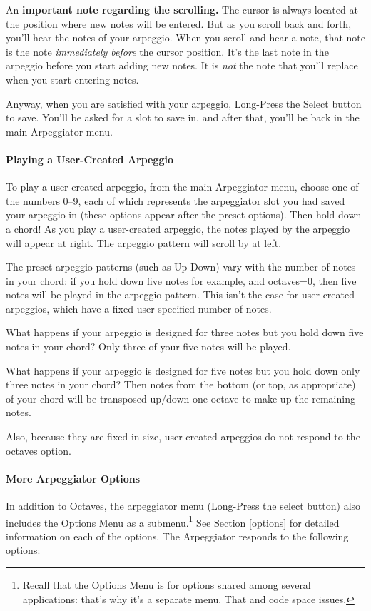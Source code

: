 \documentclass{article}
\begin{document}
An {\bf important note regarding the scrolling.}  The cursor is always located at the position where new notes will be entered.  But as you scroll back and forth, you'll hear the notes of your arpeggio.  When you scroll and hear a note, that note is the note {\it immediately before} the cursor position.  It's the last note in the arpeggio before you start adding new notes. It is {\it not} the note that you'll replace when you start entering notes. 

Anyway, when you are satisfied with your arpeggio, Long-Press the Select button to save.  You'll be asked for a slot to save in, and after that, you'll be back in the main Arpeggiator menu.

\paragraph{Playing a User-Created Arpeggio}

To play a user-created arpeggio, from the main Arpeggiator menu, choose one of the numbers 0--9, each of which represents the arpeggiator slot you had saved your arpeggio in (these options appear after the preset options).  Then hold down a chord!  As you play a user-created arpeggio, the notes played by the arpeggio will appear at right.  The arpeggio pattern will scroll by at left.


The preset arpeggio patterns (such as Up-Down) vary with the number of notes in your chord: if you hold down five notes for example, and octaves=0, then five notes will be played in the arpeggio pattern.  This isn't the case for user-created arpeggios, which have a fixed user-specified number of notes.

What happens if your arpeggio is designed for three notes but you hold down  five notes in your chord?  Only three of your five notes will be played.

What happens if your arpeggio is designed for five notes but you hold down only three notes in your chord?  Then notes from the bottom (or top, as appropriate) of your chord will be transposed up/down one octave to make up the remaining notes.

Also, because they are fixed in size, user-created arpeggios do not respond to the octaves option.

\paragraph{More Arpeggiator Options}

In addition to Octaves, the arpeggiator menu (Long-Press the select button) also includes the Options Menu as a submenu.\footnote{Recall that the Options Menu is for options shared among several applications: that's why it's a separate menu.  That and code space issues.}  See Section \ref{options} for detailed information on each of the options.  The Arpeggiator responds to the following options:
\end{document}
